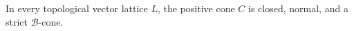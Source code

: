 In every topological vector lattice $L$, the positive cone $C$ is closed, normal, and a strict $\mathcal{B}$-cone.
